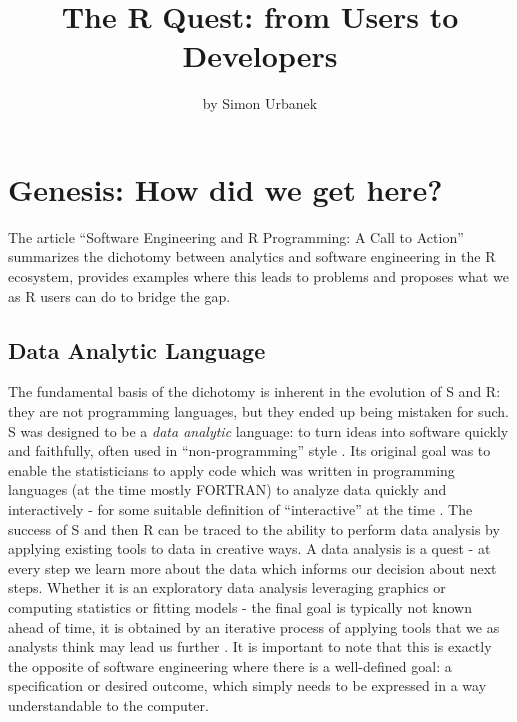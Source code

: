 \title{The R Quest: from Users to Developers}
\author{by Simon Urbanek}

\maketitle


\hypertarget{genesis-how-did-we-get-here}{%
\section{Genesis: How did we get
here?}\label{genesis-how-did-we-get-here}}

The article ``Software Engineering and R Programming: A Call to Action''
summarizes the dichotomy between analytics and software engineering in
the R ecosystem, provides examples where this leads to problems and
proposes what we as R users can do to bridge the gap.

\hypertarget{data-analytic-language}{%
\subsection{Data Analytic Language}\label{data-analytic-language}}

The fundamental basis of the dichotomy is inherent in the evolution of S
and R: they are not programming languages, but they ended up being
mistaken for such. S was designed to be a \emph{data analytic} language:
to turn ideas into software quickly and faithfully, often used in
``non-programming'' style \citep{JohnPWD}. Its original goal was to
enable the statisticians to apply code which was written in programming
languages (at the time mostly FORTRAN) to analyze data quickly and
interactively - for some suitable definition of ``interactive'' at the
time \citep{RickBHS}. The success of S and then R can be traced to the
ability to perform data analysis by applying existing tools to data in
creative ways. A data analysis is a quest - at every step we learn more
about the data which informs our decision about next steps. Whether it
is an exploratory data analysis leveraging graphics or computing
statistics or fitting models - the final goal is typically not known
ahead of time, it is obtained by an iterative process of applying tools
that we as analysts think may lead us further \citep{EDA}. It is
important to note that this is exactly the opposite of software
engineering where there is a well-defined goal: a specification or
desired outcome, which simply needs to be expressed in a way
understandable to the computer.

